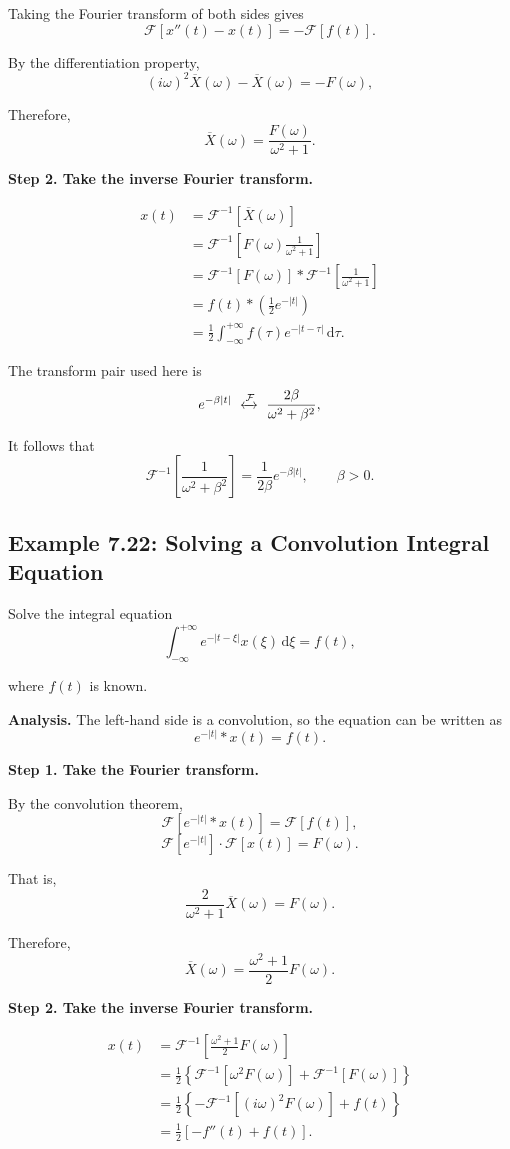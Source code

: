 \documentclass[11pt,a4paper]{article}
\theoremstyle{definition}
\theoremstyle{plain}
\begin{document}
Taking the Fourier transform of both sides gives
\[
\mathcal F[x''(t)-x(t)]=-\mathcal F[f(t)].
\]

By the differentiation property,
\[
(i\omega)^2\overline X(\omega)-\overline X(\omega)
=-F(\omega),
\]

Therefore,
\[
\overline X(\omega)=\frac{F(\omega)}{\omega^2+1}.
\]

\textbf{Step 2. Take the inverse Fourier transform.}\par\nopagebreak[4]
\[
\begin{aligned}
x(t)
&=\mathcal F^{-1}[\overline X(\omega)]\\
&=\mathcal F^{-1}\!\left[
F(\omega)\frac1{\omega^2+1}
\right]\\
&=\mathcal F^{-1}[F(\omega)]
*\mathcal F^{-1}\!\left[\frac1{\omega^2+1}\right]\\
&=f(t)*\left(\frac12e^{-|t|}\right)\\
&=\frac12\int_{-\infty}^{+\infty}
f(\tau)e^{-|t-\tau|}\,\mathrm d\tau.
\end{aligned}
\]

The transform pair used here is
\[
e^{-\beta|t|}
\ \xleftrightarrow{\mathcal F}\
\frac{2\beta}{\omega^2+\beta^2},
\]

It follows that
\[
\mathcal F^{-1}\!\left[\frac1{\omega^2+\beta^2}\right]
=\frac1{2\beta}e^{-\beta|t|},
\qquad \beta>0.
\]

\subsection{Example 7.22: Solving a Convolution Integral Equation}

Solve the integral equation
\[
\int_{-\infty}^{+\infty}
e^{-|t-\xi|}x(\xi)\,\mathrm d\xi
=f(t),
\]

where \(f(t)\) is known.

\textbf{Analysis.} The left-hand side is a convolution, so the equation
can be written as
\[
e^{-|t|}*x(t)=f(t).
\]

\textbf{Step 1. Take the Fourier transform.}\par\nopagebreak[4]
By the convolution theorem,
\[
\mathcal F[e^{-|t|}*x(t)]
=\mathcal F[f(t)],
\]
\[
\mathcal F[e^{-|t|}]\cdot\mathcal F[x(t)]
=F(\omega).
\]

That is,
\[
\frac2{\omega^2+1}\overline X(\omega)=F(\omega).
\]

Therefore,
\[
\overline X(\omega)
=\frac{\omega^2+1}{2}F(\omega).
\]

\textbf{Step 2. Take the inverse Fourier transform.}\par\nopagebreak[4]
\[
\begin{aligned}
x(t)
&=\mathcal F^{-1}\!\left[
\frac{\omega^2+1}{2}F(\omega)
\right]\\
&=\frac12\left\{
\mathcal F^{-1}[\omega^2F(\omega)]
+\mathcal F^{-1}[F(\omega)]
\right\}\\
&=\frac12\left\{
-\mathcal F^{-1}[(i\omega)^2F(\omega)]
+f(t)
\right\}\\
&=\frac12[-f''(t)+f(t)].
\end{aligned}
\]
\end{document}
